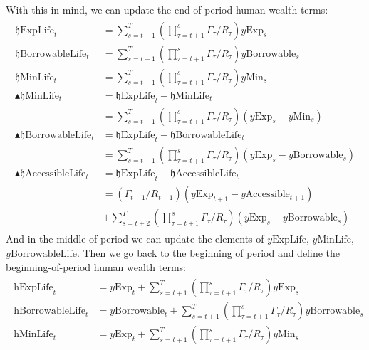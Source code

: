 \documentclass[titlepage,abstract]{\econtex}
\providecommand{\hExpLife}{\mathrm{h}\text{ExpLife}}
\providecommand{\hMinLife}{\mathrm{h}\text{MinLife}}
\providecommand{\hBorrowableLife}{\mathrm{h}\text{BorrowableLife}}
\providecommand{\hEndExpLife}{\mathfrak{h}\text{ExpLife}}
\providecommand{\hEndMinLife}{\mathfrak{h}\text{MinLife}}
\providecommand{\hEndBorrowableLife}{\mathfrak{h}\text{BorrowableLife}}
\providecommand{\hEndAccessibleLife}{\mathfrak{h}\text{AccessibleLife}}
\providecommand{\DeltahEndMinLife}{\blacktriangle \mathfrak{h}\text{MinLife}}
\providecommand{\DeltahEndBorrowableLife}{\blacktriangle \mathfrak{h}\text{BorrowableLife}}
\providecommand{\DeltahEndAccessibleLife}{\blacktriangle \mathfrak{h}\text{AccessibleLife}}
\providecommand{\yMinLife}{y\text{MinLife}}
\providecommand{\yBorrowableLife}{y\text{BorrowableLife}}
\providecommand{\yExpLife}{y\text{ExpLife}}
\providecommand{\yMin}{y\text{Min}}
\providecommand{\yBorrowable}{y\text{Borrowable}}
\providecommand{\yAccessible}{y\text{Accessible}}
\providecommand{\yExp}{y\text{Exp}}
\begin{document}
With this in-mind, we can update the end-of-period human wealth terms:
\begin{equation}\begin{gathered}\begin{aligned}
          \hEndExpLife_{t}  & =  \sum_{s=t+1}^{T} (\prod_{\tau=t+1}^{s}\Gamma_{\tau} /R_{\tau}) \yExp_{s} \\
          \hEndBorrowableLife_{t}  & =  \sum_{s=t+1}^{T} (\prod_{\tau=t+1}^{s}\Gamma_{\tau}/R_{\tau}) \yBorrowable_{s} \\
          \hEndMinLife_{t}  & =  \sum_{s=t+1}^{T} (\prod_{\tau=t+1}^{s}\Gamma_{\tau}/R_{\tau}) \yMin_{s} \\
          \DeltahEndMinLife_{t}  & =  \hEndExpLife_{t} -  \hEndMinLife_{t}\\
                           & =  \sum_{s=t+1}^{T} (\prod_{\tau=t+1}^{s}\Gamma_{\tau}/R_{\tau}) (\yExp_{s}-\yMin_{s}) \\
          \DeltahEndBorrowableLife_{t}  & =  \hEndExpLife_{t} -  \hEndBorrowableLife_{t}\\
                           & =  \sum_{s=t+1}^{T} (\prod_{\tau=t+1}^{s}\Gamma_{\tau}/R_{\tau}) (\yExp_{s}-\yBorrowable_{s}) \\
          \DeltahEndAccessibleLife_{t}  & =  \hEndExpLife_{t} -  \hEndAccessibleLife_{t}\\
                           & =  (\Gamma_{t+1}/R_{t+1}) (\yExp_{t+1}-\yAccessible_{t+1}) \\
                          &  +\sum_{s=t+2}^{T} (\prod_{\tau=t+1}^{s}\Gamma_{\tau}/R_{\tau}) (\yExp_{s}-\yBorrowable_{s})
\end{aligned}\end{gathered}\end{equation}
And in the middle of period we can update the elements of $\yExpLife$, $\yMinLife$, $\yBorrowableLife$. Then we go back to the beginning of period and define the beginning-of-period human wealth terms:
\begin{equation}\begin{gathered}\begin{aligned}
          \hExpLife_{t}  & =  \yExp_{t} + \sum_{s=t+1}^{T} (\prod_{\tau=t+1}^{s}\Gamma_{\tau} /R_{\tau}) \yExp_{s} \\
          \hBorrowableLife_{t}  & =  \yBorrowable_{t} + \sum_{s=t+1}^{T} (\prod_{\tau=t+1}^{s}\Gamma_{\tau}/R_{\tau}) \yBorrowable_{s} \\
          \hMinLife_{t}  & =  \yExp_{t} +\sum_{s=t+1}^{T} (\prod_{\tau=t+1}^{s}\Gamma_{\tau}/R_{\tau}) \yMin_{s}
\end{aligned}\end{gathered}\end{equation}
\end{document}
